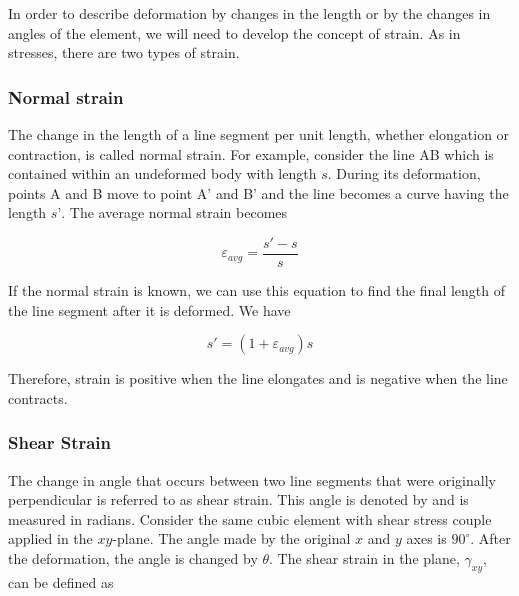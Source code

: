 \documentclass[
10pt,
a4paper,
openany,
svgnames,
]{book}
\begin{document}
In order to describe deformation by changes in the length or by the changes in angles of the element, we will need to develop the concept of strain. As in stresses, there are two types of strain.

\subsubsection{Normal strain}

The change in the length of a line segment per unit length, whether elongation or contraction, is called normal strain. For example, consider the line AB which is contained within an undeformed body with length $s$. During its deformation, points A and B move to point A’ and B’ and the line becomes a curve having the length $s’$. The average normal strain becomes

\begin{equation}
  \varepsilon _{avg} = \frac{s' - s}{s}
\end{equation}

If the normal strain is known, we can use this equation to find the final length of the line segment after it is deformed. We have

\begin{equation}
  s' = (1 + \varepsilon_{avg})s
\end{equation}

Therefore, strain is positive when the line elongates and is negative when the line contracts.

\subsubsection{Shear Strain}

The change in angle that occurs between two line segments that were originally perpendicular is referred to as shear strain. This angle is denoted by and is measured in radians. Consider the same cubic element with shear stress couple applied in the $xy$-plane. The angle made by the original $x$ and $y$ axes is $90^{\circ}$. After the deformation, the angle is changed by $\theta$. The shear strain in the plane, $\gamma_{xy}$, can be defined as 
\end{document}
